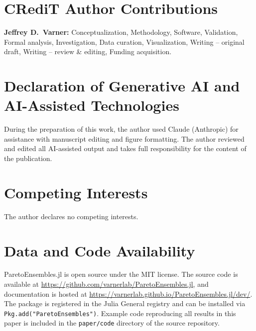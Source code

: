 \documentclass[preprint,review,12pt]{elsarticle}
\begin{document}
\section*{CRediT Author Contributions}
\begin{sloppypar}
\textbf{Jeffrey D.\ Varner:} Conceptualization, Methodology, Software, Validation, Formal analysis, Investigation, Data curation, Visualization, Writing -- original draft, Writing -- review \& editing, Funding acquisition.
\end{sloppypar}

\section*{Declaration of Generative AI and AI-Assisted Technologies}
During the preparation of this work, the author used Claude (Anthropic) for assistance with manuscript editing and figure formatting.
The author reviewed and edited all AI-assisted output and takes full responsibility for the content of the publication.

\section*{Competing Interests}
The author declares no competing interests.

\section*{Data and Code Availability}
\begin{sloppypar}
ParetoEnsembles.jl is open source under the MIT license.
The source code is available at
\url{https://github.com/varnerlab/ParetoEnsembles.jl},
and documentation is hosted at
\url{https://varnerlab.github.io/ParetoEnsembles.jl/dev/}.
The package is registered in the Julia General registry and can be installed via \texttt{Pkg.add("ParetoEnsembles")}.
Example code reproducing all results in this paper is included in the \texttt{paper/code} directory of the source repository.
\end{sloppypar}


\end{document}
